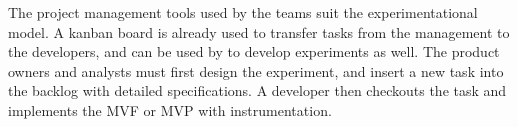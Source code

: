 \documentclass[english, grading]{tktltiki2}
\theoremstyle{definition}
\theoremstyle{remark}
\begin{document}
The project management tools used by the teams suit the experimentational model. A kanban board is already used to transfer tasks from the management to the developers, and can be used by to develop experiments as well. The product owners and analysts must first design the experiment, and insert a new task into the backlog with detailed specifications. A developer then checkouts the task and implements the MVF or MVP with instrumentation. 


\end{document}

